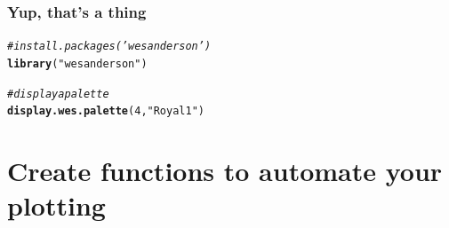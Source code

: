 \documentclass{beamer}\usepackage[]{graphicx}\usepackage[]{color}
\makeatletter
\newcommand{\hlnum}[1]{\textcolor[rgb]{0.686,0.059,0.569}{#1}}%
\newcommand{\hlstr}[1]{\textcolor[rgb]{0.192,0.494,0.8}{#1}}%
\newcommand{\hlcom}[1]{\textcolor[rgb]{0.678,0.584,0.686}{\textit{#1}}}%
\newcommand{\hlstd}[1]{\textcolor[rgb]{0.345,0.345,0.345}{#1}}%
\newcommand{\hlkwd}[1]{\textcolor[rgb]{0.737,0.353,0.396}{\textbf{#1}}}%
\newenvironment{kframe}{%
 \def\at@end@of@kframe{}%
 \ifinner\ifhmode%
  \def\at@end@of@kframe{\end{minipage}}%
  \begin{minipage}{\columnwidth}%
 \fi\fi%
 \def\FrameCommand##1{\hskip\@totalleftmargin \hskip-\fboxsep
 \colorbox{shadecolor}{##1}\hskip-\fboxsep
     \hskip-\linewidth \hskip-\@totalleftmargin \hskip\columnwidth}%
 \MakeFramed {\advance\hsize-\width
   \@totalleftmargin\z@ \linewidth\hsize
   \@setminipage}}%
 {\par\unskip\endMakeFramed%
 \at@end@of@kframe}
\newenvironment{knitrout}{}{} %
\makeatother
\begin{document}
\begin{frame}[fragile]
\frametitle{Yup, that's a thing}
\begin{center}
\begin{knitrout}\footnotesize
{}\color{fgcolor}\begin{kframe}
\begin{alltt}
\hlcom{# install.packages('wesanderson')}
\hlkwd{library}\hlstd{(}\hlstr{"wesanderson"}\hlstd{)}
\end{alltt}


{\ttfamily\noindent\bfseries\color{errorcolor}{\#\# Error: there is no package called 'wesanderson'}}\begin{alltt}
\hlcom{# display a palette}
\hlkwd{display.wes.palette}\hlstd{(}\hlnum{4}\hlstd{,} \hlstr{"Royal1"}\hlstd{)}
\end{alltt}


{\ttfamily\noindent\bfseries{}}\end{kframe}
\end{knitrout}
\end{center}
\end{frame}


\section*{Create functions to automate your plotting}
\frame{\sectionpage}

\end{document}
